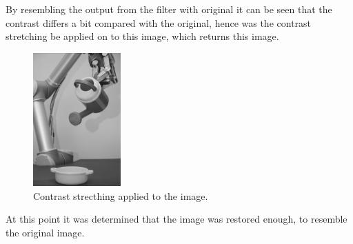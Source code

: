  By resembling the output from the filter with original it can be seen that the contrast differs a bit compared with the original,  hence was the contrast stretching be applied on to this image, which returns this image. 
 
 \begin{figure}[H]
 \centering
 \includegraphics[width=0.3\textwidth]{img4/filteredOutput_6509_contrast_strech.png}
 	\caption{Contrast strecthing applied to the image. }
    \label{fig:filter_become_ideal}
\end{figure} 
At this point it was determined that the image was restored enough, to resemble the original image. 

